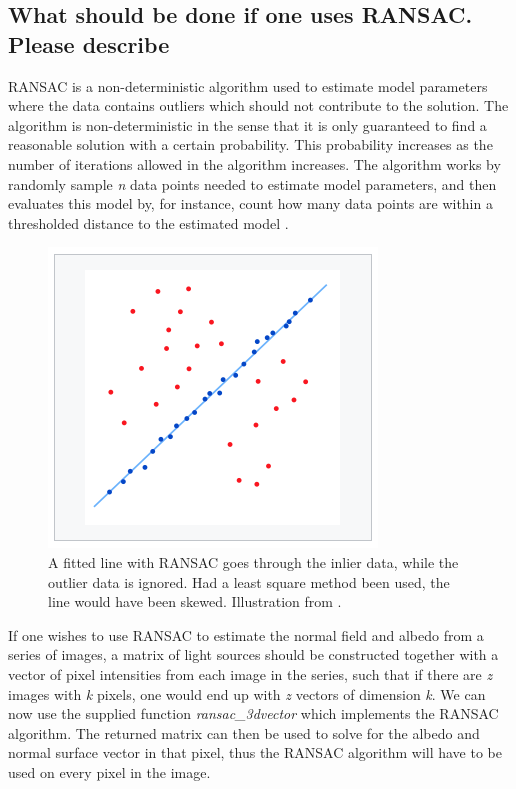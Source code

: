 \subsection{What should be done if one uses RANSAC. Please describe}
RANSAC is a non-deterministic algorithm used to estimate model parameters where the data contains outliers which should not contribute to the solution. The algorithm is non-deterministic in the sense that it is only guaranteed to find a reasonable solution with a certain probability. This probability increases as the number of iterations allowed in the algorithm increases. The algorithm works by randomly sample \textit{n} data points needed to estimate model parameters, and then evaluates this model by, for instance, count how many data points are within a thresholded distance to the estimated model \cite{ransac_wiki}.
\begin{figure}[H]
	\centering
	\includegraphics[width=0.5\linewidth]{Materials/Ransac}
	\caption{A fitted line with RANSAC goes through the inlier data, while the outlier data is ignored. Had a least square method been used, the line would have been skewed. Illustration from \cite{ransac_wiki}.}
\end{figure}
If one wishes to use RANSAC to estimate the normal field and albedo from a series of images, a matrix of light sources should be constructed together with a vector of pixel intensities from each image in the series, such that if there are \textit{z} images with \textit{k} pixels, one would end up with \textit{z} vectors of dimension \textit{k}. We can now use the supplied function \textit{ransac\_3dvector} which implements the RANSAC algorithm. The returned matrix can then be used to solve for the albedo and normal surface vector in that pixel, thus the RANSAC algorithm will have to be used on every pixel in the image.